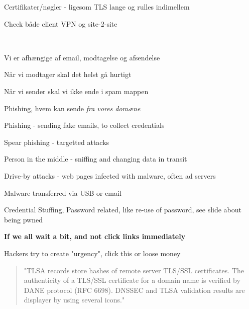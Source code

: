\documentclass[Screen16to9,17pt]{foils}
\begin{document}
\begin{list2}
\item Certifikater/nøgler - ligesom TLS lange og rulles indimellem
\item Check både client VPN og site-2-site
\end{list2}


{~}

\begin{list2}
\item Vi er afhængige af email, modtagelse og afsendelse
\item Når vi modtager skal det helst gå hurtigt
\item Når vi sender skal vi ikke ende i spam mappen
\item Phishing, hvem kan sende \emph{fra vores domæne}
\end{list2}



\begin{list2}
\item Phishing - sending fake emails, to collect credentials
\item Spear phishing - targetted attacks
\item Person in the middle - sniffing and changing data in transit
\item Drive-by attacks - web pages infected with malware, often ad servers
\item Malware transferred via USB or email
\item Credential Stuffing, Password related, like re-use of password, see slide about being pwned
\end{list2}

\vskip 1cm
\centerline{\Large\bf If we all wait a bit, and not click links immediately}

\vskip 1cm
Hackers try to create "urgency", click this or loose money




\begin{quote}
"TLSA records store hashes of remote server TLS/SSL certificates. The authenticity of a TLS/SSL certificate for a domain name is verified by DANE protocol (RFC 6698). DNSSEC and TLSA validation results are displayer by using several icons."
\end{quote}
\end{document}
